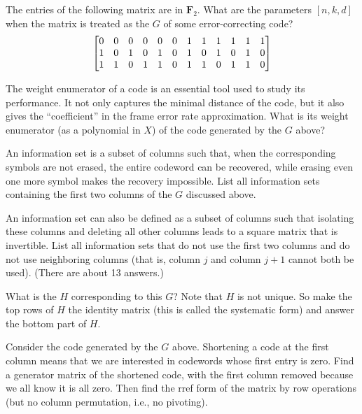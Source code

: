 \documentclass[a4paper]{article}
\def\FF{\mathbf F}
\begin{document}

\Problem{4em}
The entries of the following matrix are in $\FF_2$.
What are the parameters $[n, k, d]$
when the matrix is treated as the $G$ of some error-correcting code?
\[
    \setcounter{MaxMatrixCols}{12}
    \begin{bmatrix}
        0 & 0 & 0 & 0 & 0 & 0 & 1 & 1 & 1 & 1 & 1 & 1 \\
        1 & 0 & 1 & 0 & 1 & 0 & 1 & 0 & 1 & 0 & 1 & 0 \\
        1 & 1 & 0 & 1 & 1 & 0 & 1 & 1 & 0 & 1 & 1 & 0 \\
    \end{bmatrix}
\]

\Problem{10em}
The weight enumerator of a code
is an essential tool used to study its performance.
It not only captures the minimal distance of the code, but it also
gives the ``coefficient'' in the frame error rate approximation.
What is its weight enumerator (as a polynomial in $X$)
of the code generated by the $G$ above?

\Problem{10em}
An information set is a subset of columns such that,
when the corresponding symbols are not erased,
the entire codeword can be recovered,
while erasing even one more symbol makes the recovery impossible.
List all information sets containing the first two columns
of the $G$ discussed above.

\Problem{10em}
An information set can also be defined
as a subset of columns such that
isolating these columns and deleting all other columns
leads to a square matrix that is invertible.
List all information sets that
do not use the first two columns and
do not use neighboring columns
(that is, column $j$ and column $j + 1$ cannot both be used).
(There are about 13 answers.)

\Problem{10em}
What is the $H$ corresponding to this $G$?
Note that $H$ is not unique.
So make the top rows of $H$ the identity matrix
(this is called the systematic form)
and answer the bottom part of $H$.

\Problem{10em}
Consider the code generated by the $G$ above.
Shortening a code at the first column means that
we are interested in codewords whose first entry is zero.
Find a generator matrix of the shortened code,
with the first column removed because we all know it is all zero.
Then find the rref form of the matrix by row operations
(but no column permutation, i.e., no pivoting).
\end{document}
